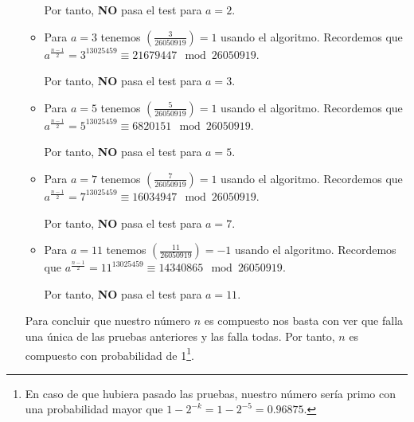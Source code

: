 \begin{enumerate}
\begin{itemize}
			Por tanto, \textbf{NO} pasa el test para $a = 2$.
			
			\item Para $a = 3$ tenemos $\displaystyle \left(\frac{3}{26050919} \right) = 1$ usando el algoritmo.
			Recordemos que $ a^{\frac{n-1}{2}} = 3^{13025459} \equiv 21679447 \mod 26050919$.
			
			Por tanto, \textbf{NO} pasa el test para $a = 3$.
			
			\item Para $a = 5$ tenemos $\displaystyle \left(\frac{5}{26050919} \right) = 1$ usando el algoritmo.
			Recordemos que $ a^{\frac{n-1}{2}} = 5^{13025459} \equiv 6820151 \mod 26050919$.
			
			Por tanto, \textbf{NO} pasa el test para $a = 5$.
			
			\item Para $a = 7$ tenemos $\displaystyle \left(\frac{7}{26050919} \right) = 1$ usando el algoritmo.
			Recordemos que $ a^{\frac{n-1}{2}} = 7^{13025459} \equiv 16034947 \mod 26050919$.
			
			Por tanto, \textbf{NO} pasa el test para $a = 7$.
			
			\item Para $a = 11$ tenemos $\displaystyle \left(\frac{11}{26050919} \right) = -1$ usando el algoritmo.
			Recordemos que $ a^{\frac{n-1}{2}} = 11^{13025459} \equiv 14340865 \mod 26050919$.
			
			Por tanto, \textbf{NO} pasa el test para $a = 11$.		
		\end{itemize}
		
		Para concluir que nuestro número $n$ es compuesto nos basta con ver que falla una única de las pruebas
		anteriores y las falla todas. Por tanto, $n$ es compuesto con probabilidad de 1\footnote{En caso de que
		hubiera pasado las pruebas, nuestro número sería primo con una probabilidad mayor que $1-2^{-k} =
		1-2^{-5} = 0.96875$.}.
		
	\end{enumerate}

